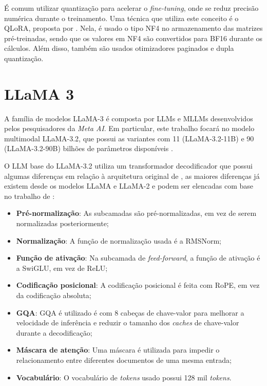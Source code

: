 
É comum utilizar quantização para acelerar o \textit{fine-tuning}, onde se reduz precisão numérica durante o
treinamento. Uma técnica que utiliza este conceito é o \ac{QLoRA}, proposta por \textcite{qlora}. Nela, é usado o tipo
\ac{NF4} no armazenamento das matrizes pré-treinadas, sendo que os valores em \ac{NF4} são convertidos para \ac{BF16}
durante os cálculos. Além disso, também são usados otimizadores paginados e dupla quantização.

\section{LLaMA 3}

A família de modelos \ac{LLaMA}-3 é composta por \acp{LLM} e \acp{MLLM} desenvolvidos pelos pesquisadores da
\textit{Meta AI}. Em particular, este trabalho focará no modelo multimodal \ac{LLaMA}-3.2, que possui as variantes com
11 (\ac{LLaMA}-3.2-11B) e 90 (\ac{LLaMA}-3.2-90B) bilhões de parâmetros disponíveis \cite{dubey2024llama}.

O \ac{LLM} base do \ac{LLaMA}-3.2 utiliza um transformador decodificador que possui algumas diferenças em relação à
arquitetura original de \textcite{transformer}, as maiores diferenças já existem desde os modelos \ac{LLaMA} e
\ac{LLaMA}-2 e podem ser elencadas com base no trabalho de \textcite{touvron2023llama}:

\begin{itemize}
    \item \textbf{Pré-normalização}: As subcamadas são pré-normalizadas, em vez de serem normalizadas
          posteriormente;
    \item \textbf{Normalização}: A função de normalização usada é a \ac{RMSNorm};
    \item \textbf{Função de ativação}: Na subcamada de \textit{feed-forward}, a função de ativação é a \ac{SwiGLU},
          em vez de
          \ac{ReLU};
    \item \textbf{Codificação posicional}: A codificação posicional é feita com \ac{RoPE}, em vez da codificação
          absoluta;
    \item \textbf{\acs{GQA}}: \ac{GQA} é utilizado é com 8 cabeças de chave-valor para melhorar a velocidade de
          inferência e
          reduzir o tamanho dos \textit{caches} de chave-valor durante a decodificação;
    \item \textbf{Máscara de atenção}: Uma máscara é utilizada para impedir o relacionamento entre diferentes
          documentos de uma
          mesma entrada;
    \item \textbf{Vocabulário}: O vocabulário de \textit{tokens} usado possui 128 mil \textit{tokens}.
\end{itemize}


